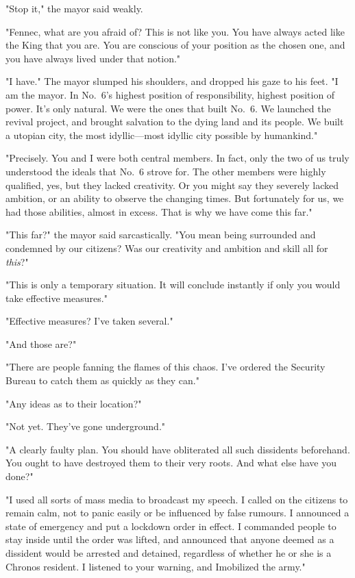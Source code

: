 "\el Stop it," the mayor said weakly.

"Fennec, what are you afraid of? This is not like you. You have always
acted like the King that you are. You are conscious of your position as
the chosen one, and you have always lived under that notion."

"I have." The mayor slumped his shoulders, and dropped his gaze to his
feet. "I am the mayor. In No.~6's highest position of responsibility,
highest position of power. It's only natural. We were the ones that
built No.~6. We launched the revival project, and brought salvation to
the dying land and its people. We built a utopian city, the most
idyllic---most idyllic city possible by humankind."

"Precisely. You and I were both central members. In fact, only the two
of us truly understood the ideals that No.~6 strove for. The other
members were highly qualified, yes, but they lacked creativity. Or you
might say they severely lacked ambition, or an ability to observe the
changing times. But fortunately for us, we had those abilities, almost
in excess. That is why we have come this far."

"This far?" the mayor said sarcastically. "You mean being surrounded and
condemned by our citizens? Was our creativity and ambition and skill all
for \emph{this}?"

"This is only a temporary situation. It will conclude instantly if only
you would take effective measures."

"Effective measures? I've taken several."

"And those are?"

"There are people fanning the flames of this chaos. I've ordered the
Security Bureau to catch them as quickly as they can."

"Any ideas as to their location?"

"Not yet. They've gone underground."

"A clearly faulty plan. You should have obliterated all such dissidents
beforehand. You ought to have destroyed them to their very roots. And
what else have you done?"

"I used all sorts of mass media to broadcast my speech. I called on the
citizens to remain calm, not to panic easily or be influenced by false
rumours. I announced a state of emergency and put a lockdown order in
effect. I commanded people to stay inside until the order was lifted,
and announced that anyone deemed as a dissident would be arrested and
detained, regardless of whether he or she is a Chronos resident. I
listened to your warning, and I\el mobilized the army."

